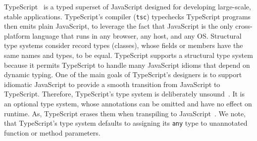 \documentclass[acmsmall, review, anonymous]{acmart}\settopmatter{printfolios=true,printccs=false,printacmref=false}
\begin{document}
TypeScript~\citep{typescript} is a typed superset of
JavaScript designed for developing large-scale, stable applications.
TypeScript's compiler (\lstinline+tsc+) typechecks TypeScript programs then emits plain JavaScript,
to leverage the fact that JavaScript is the only cross-platform
language that runs in any browser, any host, and any OS.
Structural type systems consider record types (classes), whose fields or members have the same names and types, to be equal.
TypeScript supports a
structural type system because it permits TypeScript to handle many JavaScript idioms that depend on dynamic typing.
One of the main goals of TypeScript's designers is to support idiomatic
JavaScript to
provide a smooth transition from JavaScript to TypeScript.
%
Therefore, TypeScript's type system is deliberately
unsound~\citep{understandtypescript}.  It is an optional type system, whose
annotations can be omitted and have no effect on runtime. As, TypeScript erases 
them when transpiling to JavaScript~\citep{understandtypescript}.
We note, that TypeScript's type system defaults to assigning its \texttt{\small{any}} type to unannotated function or method parameters.  


\end{document}
